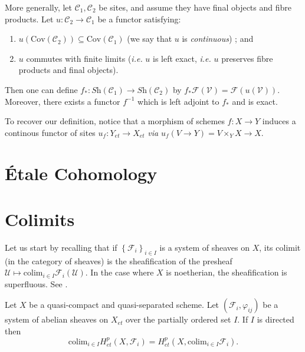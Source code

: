 \begin{remark}
\label{remark-functoriality-general}
More generally, let $\mathcal{C}_1, \mathcal{C}_2$ be sites, and
assume they have final objects and fibre products. Let
$u: \mathcal{C}_2 \to \mathcal{C}_1$ be a functor satisfying:
\begin{enumerate}
\item $u (\text{Cov}(\mathcal{C}_2)) \subseteq \text{Cov}(\mathcal{C}_1)$ (we
say that $u$ is {\it continuous}) ; and
\item $u$ commutes with finite limits ({\it i.e.} $u$ is left exact, {\it i.e.}
$u$ preserves fibre products and final objects).
\end{enumerate}
Then one can define $f_*: \textit{Sh}(\mathcal{C}_1) \to
\textit{Sh}(\mathcal{C}_2)$ by $ f_* \mathcal{F}(\mathcal{V}) =
\mathcal{F}(u(\mathcal{V}))$. Moreover, there exists a functor $f^{-1}$ which
is left adjoint to $f_*$ and is exact.

\medskip\noindent
To recover our definition, notice that a morphism of schemes $ f: X \to Y$
induces a continous functor of sites $u_f: Y_{et} \to X_{et}$ {\it via} $u_f (V
\to Y) = V \times_Y X \to X$.
\end{remark}






\section{\'Etale Cohomology}
\label{section-etale-cohomology}


\section{Colimits}
\label{section-colimit}

\noindent
Let us start by recalling that if $\left\{\mathcal{F}_i\right\}_{i\in I}$ is a
system of sheaves on $X$, its colimit (in the category of sheaves) is the
sheafification of the presheaf $\mathcal{U} \mapsto \text{colim}_{i\in I}
\mathcal{F}_i(\mathcal{U})$. In the case where $X$ is noetherian, the
sheafification is superfluous. See \cite{H}.

\begin{theorem}
\label{theorem-colimit}
Let $X$ be a quasi-compact and quasi-separated scheme. Let
$\left(\mathcal{F}_i, \varphi_{ij}\right)$ be a system of abelian sheaves on
$X_{et}$ over the partially ordered set $I$. If $I$ is directed then
$$
\text{colim}_{i\in I} H_{et}^p(X, \mathcal{F}_i) = H_{et}^p(X,
\text{colim}_{i\in I} \mathcal{F}_i).
$$
\end{theorem}

